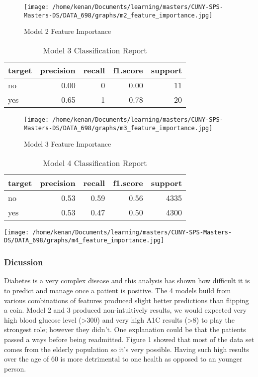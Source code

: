 \documentclass[5p]{elsarticle} %
\begin{document}
\begin{figure}
\hypertarget{id}{%
\centering
\texttt{[image: /home/kenan/Documents/learning/masters/CUNY-SPS-Masters-DS/DATA\_698/graphs/m2\_feature\_importance.jpg]}
\caption{Model 2 Feature Importance}\label{id}
}
\end{figure}

\begin{table}

\caption{\label{tab:unnamed-chunk-5}Model 3 Classification Report}
\centering
\begin{tabular}[t]{l|r|r|r|r}
\hline
target & precision & recall & f1.score & support\\
\hline
no & 0.00 & 0 & 0.00 & 11\\
\hline
yes & 0.65 & 1 & 0.78 & 20\\
\hline
\end{tabular}
\end{table}

\begin{figure}
\hypertarget{id}{%
\centering
\texttt{[image: /home/kenan/Documents/learning/masters/CUNY-SPS-Masters-DS/DATA\_698/graphs/m3\_feature\_importance.jpg]}
\caption{Model 3 Feature Importance}\label{id}
}
\end{figure}

\begin{table}

\caption{\label{tab:unnamed-chunk-6}Model 4 Classification Report}
\centering
\begin{tabular}[t]{l|r|r|r|r}
\hline
target & precision & recall & f1.score & support\\
\hline
no & 0.53 & 0.59 & 0.56 & 4335\\
\hline
yes & 0.53 & 0.47 & 0.50 & 4300\\
\hline
\end{tabular}
\end{table}

\texttt{[image: /home/kenan/Documents/learning/masters/CUNY-SPS-Masters-DS/DATA\_698/graphs/m4\_feature\_importance.jpg]}
\clearpage \twocolumn

\hypertarget{dicussion}{%
\subsubsection{Dicussion}\label{dicussion}}

Diabetes is a very complex disease and this analysis has shown how
difficult it is to predict and manage once a patient is positive. The 4
models build from various combinations of features produced slight
better predictions than flipping a coin. Model 2 and 3 produced
non-intuitively results, we would expected very high blood glucose level
(\textgreater300) and very high A1C results (\textgreater8) to play the
strongest role; however they didn't. One explanation could be that the
patients passed a ways before being readmitted. Figure 1 showed that
most of the data set comes from the elderly population so it's very
possible. Having such high results over the age of 60 is more
detrimental to one health as opposed to an younger person.
\end{document}
